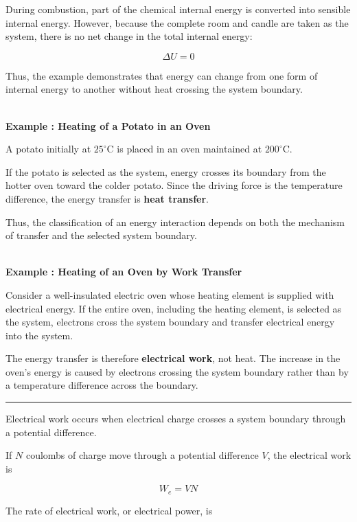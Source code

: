 \documentclass[12pt]{article}
\newcommand{\mysubsection}[2]{%
    \vspace{5px}
    \noindent{\headingfont\large #1\space #2\par}
    \vspace{4pt}
    \hrule
    \vspace{15pt}
}
\begin{document}
During combustion, part of the chemical internal energy is converted into sensible internal energy. However, because the complete room and candle are taken as the system, there is no net change in the total internal energy:

\begin{equation*}
\Delta U=0
\end{equation*}

Thus, the example demonstrates that energy can change from one form of internal energy to another without heat crossing the system boundary. 

\textbf{\\ Example : Heating of a Potato in an Oven}

A potato initially at $25^\circ\mathrm{C}$ is placed in an oven maintained at $200^\circ\mathrm{C}$.

If the potato is selected as the system, energy crosses its boundary from the hotter oven toward the colder potato. Since the driving force is the temperature difference, the energy transfer is \textbf{heat transfer}.

Thus, the classification of an energy interaction depends on both the mechanism of transfer and the selected system boundary. 

\textbf{\\ Example : Heating of an Oven by Work Transfer}

Consider a well-insulated electric oven whose heating element is supplied with electrical energy. If the entire oven, including the heating element, is selected as the system, electrons cross the system boundary and transfer electrical energy into the system.

The energy transfer is therefore \textbf{electrical work}, not heat. The increase in the oven's energy is caused by electrons crossing the system boundary rather than by a temperature difference across the boundary. 

\mysubsection{}{Electrical Work}

Electrical work occurs when electrical charge crosses a system boundary through a potential difference.

If $N$ coulombs of charge move through a potential difference $V$, the electrical work is

\begin{equation*}
W_e=VN
\end{equation*}

The rate of electrical work, or electrical power, is
\end{document}
